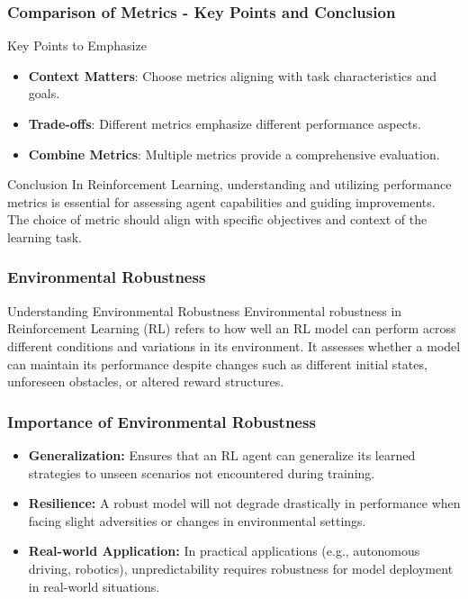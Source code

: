 \documentclass{beamer}
\begin{document}
\begin{frame}[fragile]
    \frametitle{Comparison of Metrics - Key Points and Conclusion}
    \begin{block}{Key Points to Emphasize}
        \begin{itemize}
            \item \textbf{Context Matters}: Choose metrics aligning with task characteristics and goals.
            \item \textbf{Trade-offs}: Different metrics emphasize different performance aspects.
            \item \textbf{Combine Metrics}: Multiple metrics provide a comprehensive evaluation.
        \end{itemize}
    \end{block}
    
    \begin{block}{Conclusion}
        In Reinforcement Learning, understanding and utilizing performance metrics is essential for assessing agent capabilities and guiding improvements. The choice of metric should align with specific objectives and context of the learning task.
    \end{block}
\end{frame}

\begin{frame}[fragile]
    \frametitle{Environmental Robustness}
    \begin{block}{Understanding Environmental Robustness}
        Environmental robustness in Reinforcement Learning (RL) refers to how well an RL model can perform across different conditions and variations in its environment. It assesses whether a model can maintain its performance despite changes such as different initial states, unforeseen obstacles, or altered reward structures.
    \end{block}
\end{frame}

\begin{frame}[fragile]
    \frametitle{Importance of Environmental Robustness}
    \begin{itemize}
        \item \textbf{Generalization:} Ensures that an RL agent can generalize its learned strategies to unseen scenarios not encountered during training.
        \item \textbf{Resilience:} A robust model will not degrade drastically in performance when facing slight adversities or changes in environmental settings.
        \item \textbf{Real-world Application:} In practical applications (e.g., autonomous driving, robotics), unpredictability requires robustness for model deployment in real-world situations.
    \end{itemize}
\end{frame}
\end{document}
